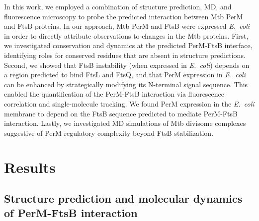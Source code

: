 \documentclass[twocolumn,pdflatex,sn-nature]{sn-jnl}%
\newcommand\ec{\textit{E.~coli}}
\newcommand\mtb{Mtb}
\begin{document}
In this work, we employed a combination of structure prediction, MD, and fluorescence microscopy to probe the predicted interaction between \mtb{} PerM and FtsB proteins. In our approach, \mtb{} PerM and FtsB were expressed \ec{} in order to directly attribute observations to changes in the \mtb{} proteins. First, we investigated conservation and dynamics at the predicted PerM-FtsB interface, identifying roles for conserved residues that are absent in structure predictions. Second, we showed that FtsB instability (when expressed in \ec{}) depends on a region predicted to bind FtsL and FtsQ, and that PerM expression in \ec{} can be enhanced by strategically modifying its N-terminal signal sequence. This enabled the quantification of the PerM-FtsB interaction via fluorescence correlation and single-molecule tracking. We found PerM expression in the \ec{} membrane to depend on the FtsB sequence predicted to mediate PerM-FtsB interaction. Lastly, we investigated MD simulations of \mtb{} divisome complexes suggestive of PerM regulatory complexity beyond FtsB stabilization.

\section{Results}

\subsection{Structure prediction and molecular dynamics of PerM-FtsB interaction}
\end{document}

